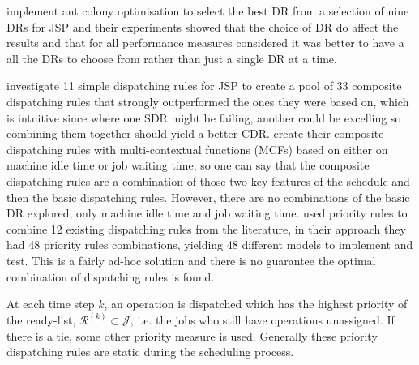 \documentclass[smallextended]{svjour3}
\begin{document}
	\citet{Korytkowski13} implement ant colony optimisation to select the best DR from a selection of nine DRs for JSP and their experiments showed that the choice of DR do affect the results and that for all performance measures considered it was better to have a all the DRs to choose from rather than just a single DR at a time. 
	
	\citet{Lu13} investigate 11 simple dispatching rules for JSP to create a pool of 33 composite dispatching rules that strongly outperformed the ones they were based on, which is intuitive since where one SDR might be failing, another could be excelling so combining them together should yield a better CDR. \citet{Lu13} create their composite dispatching rules with multi-contextual functions (MCFs) based on either on machine idle time or job waiting time, so one can say that the composite dispatching rules are a combination of those two key features of the schedule and then the basic dispatching rules. However, there are no combinations of the basic DR explored, only machine idle time and job waiting time.  
	\citet{Yu13} used priority rules to combine 12 existing dispatching rules from the literature, in their approach they had 48 priority rules combinations, yielding 48 different models to implement and test. This is a fairly ad-hoc solution and there is no guarantee the optimal combination of dispatching rules is found. 
	
	
	
	At each time step $k$, an operation is dispatched which has the highest priority of the ready-list, $\mathcal{R}^{(k)}\subset\mathcal{J}$, i.e. the jobs who still have operations unassigned. 
	If there is a tie, some other priority measure is used. Generally these priority dispatching rules are static during the scheduling process. 
	
\end{document}
